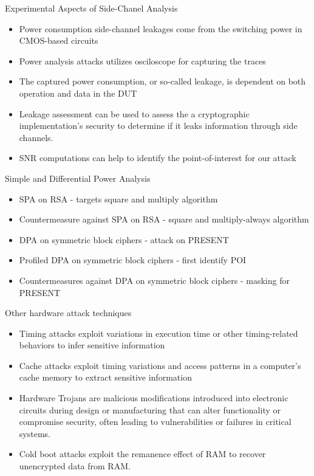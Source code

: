 \begin{frame}{Experimental Aspects of Side-Chanel Analysis}
    \begin{itemize}
        \item Power consumption side-channel leakages come from the switching power in CMOS-based circuits
        \item Power analysis attacks utilizes osciloscope for capturing the traces
        \item The captured power consumption, or so-called leakage, is dependent on both operation and data in the DUT
        \item Leakage assessment can be used to assess the a cryptographic implementation’s security to determine if it leaks information through side channels.
        \item SNR computations can help to identify the point-of-interest for our attack
    \end{itemize}
\end{frame}

\begin{frame}{Simple and Differential Power Analysis}
    \begin{itemize}
        \item SPA on RSA - targets square and multiply algorithm
        \item Countermeasure against SPA on RSA - square and multiply-always algorithm
        \item DPA on symmetric block ciphers - attack on PRESENT
        \item Profiled DPA on symmetric block ciphers - first identify POI
        \item Countermeasures against DPA on symmetric block ciphers - masking for PRESENT
    \end{itemize}
\end{frame}

\begin{frame}{Other hardware attack techniques}
    \begin{itemize}
        \item Timing attacks exploit variations in execution time or other timing-related behaviors to infer sensitive information
        \item Cache attacks exploit timing variations and access patterns in a computer's cache memory to extract sensitive information
        \item Hardware Trojans are malicious modifications introduced into electronic circuits during design or manufacturing that can alter functionality or compromise security, often leading to vulnerabilities or failures in critical systems.
        \item Cold boot attacks exploit the remanence effect of RAM to recover unencrypted data from RAM. 
    \end{itemize}
\end{frame}